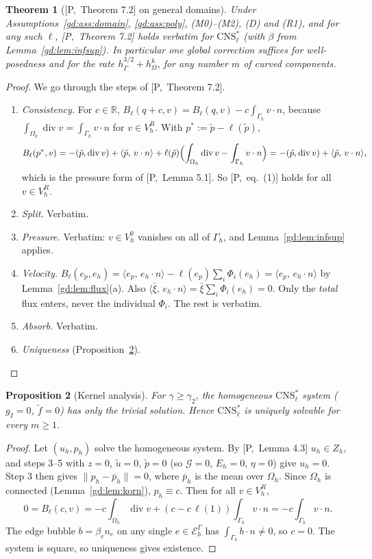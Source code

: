 \documentclass[11pt,reqno]{amsart}
\theoremstyle{plain}
\newtheorem{theorem}{Theorem}[section]
\newtheorem{proposition}[theorem]{Proposition}
\theoremstyle{definition}
\newcommand{\R}{\mathbb R}
\newcommand{\hG}{h_\Gamma}
\newcommand{\hO}{h_\Omega}
\newcommand{\Gh}{\Gamma_h}
\newcommand{\Oh}{\Omega_h}
\newcommand{\EG}{\mathcal E_h^\Gamma}
\newcommand{\VR}{V_h^R}
\newcommand{\VO}{V_h^0}
\newcommand{\Zh}{Z_h}
\newcommand{\gI}{g_I}
\newcommand{\ut}{\tilde u}
\newcommand{\pt}{\tilde p}
\newcommand{\ft}{\tilde f}
\newcommand{\ip}[2]{\langle #1,\, #2\rangle}
\newcommand{\norm}[1]{\lVert #1\rVert}
\newcommand{\CNS}{\mathrm{CNS}^\ast}
\renewcommand{\div}{\operatorname{div}}
\newcommand{\Gc}{\mathcal G}
\newcommand{\Pref}[1]{\textup{[P,~#1]}}
\begin{document}
\begin{theorem}[\Pref{Theorem 7.2} on general domains]\label{gd:thm:D}
Under Assumptions~\ref{gd:ass:domain}, \ref{gd:ass:poly}, (M0)--(M2), (D) and (R1), and for any such $\ell$, \Pref{Theorem 7.2} holds verbatim for $\CNS_\ell$ (with $\beta$ from Lemma~\ref{gd:lem:infsup}). In particular one global correction suffices for well-posedness and for the rate $\hG^{3/2}+\hO^k$, for any number $m$ of curved components.
\end{theorem}

\begin{proof}
We go through the steps of \Pref{Theorem 7.2}.
\begin{enumerate}
\item \emph{Consistency.} For $c\in\R$, $B_\ell(q+c,v)=B_\ell(q,v)-c\int_{\Gh}v\cdot n$, because $\int_{\Oh}\div v=\int_{\Gh}v\cdot n$ for $v\in\VR$. With $p^\ast:=\pt-\ell(\pt)$,
\[
B_\ell(p^\ast,v)=-(\pt,\div v)+\ip{\pt}{v\cdot n}+\ell(\pt)\Bigl(\int_{\Oh}\div v-\int_{\Gh}v\cdot n\Bigr)=-(\pt,\div v)+\ip{\pt}{v\cdot n},
\]
which is the pressure form of \Pref{Lemma 5.1}. So \Pref{eq.~(1)} holds for all $v\in\VR$.
\item \emph{Split.} Verbatim.
\item \emph{Pressure.} Verbatim: $v\in\VO$ vanishes on all of $\Gh$, and Lemma~\ref{gd:lem:infsup} applies.
\item \emph{Velocity.} $B_\ell(e_p,e_h)=\ip{e_p}{e_h\cdot n}-\ell(e_p)\sum_i\Phi_i(e_h)=\ip{e_p}{e_h\cdot n}$ by Lemma~\ref{gd:lem:flux}(a). Also $\ip{\bar\xi}{e_h\cdot n}=\bar\xi\sum_i\Phi_i(e_h)=0$. Only the \emph{total} flux enters, never the individual $\Phi_i$. The rest is verbatim.
\item \emph{Absorb.} Verbatim.
\item \emph{Uniqueness} (Proposition~\ref{gd:prop:kernel}).\qedhere
\end{enumerate}
\end{proof}

\begin{proposition}[Kernel analysis]\label{gd:prop:kernel}
For $\gamma\ge\gamma_2$, the homogeneous $\CNS_\ell$ system ($\gI=0$, $\ft=0$) has only the trivial solution. Hence $\CNS_\ell$ is uniquely solvable for every $m\ge1$.
\end{proposition}

\begin{proof}
Let $(u_h,p_h)$ solve the homogeneous system. By \Pref{Lemma 4.3} $u_h\in\Zh$, and steps 3--5 with $z=0$, $\ut=0$, $\pt=0$ (so $\Gc=0$, $E_h=0$, $\eta=0$) give $u_h=0$. Step 3 then gives $\norm{p_h-\bar p_h}=0$, where $\bar p_h$ is the mean over $\Oh$. Since $\Oh$ is connected (Lemma~\ref{gd:lem:korn}), $p_h\equiv c$. Then for all $v\in\VR$,
\[
0=B_\ell(c,v)=-c\int_{\Oh}\div v+(c-c\,\ell(1))\int_{\Gh}v\cdot n=-c\int_{\Gh}v\cdot n .
\]
The edge bubble $b=\beta_en_e$ on any single $e\in\EG$ has $\int_{\Gh}b\cdot n\ne0$, so $c=0$. The system is square, so uniqueness gives existence.
\end{proof}
\end{document}
